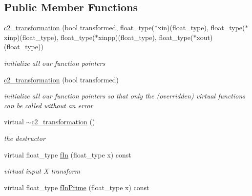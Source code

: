 \subsection*{Public Member Functions}
\begin{DoxyCompactItemize}
\item 
\hyperlink{classc2__transformation_a2b8606275a019b3a64612ecb28272999}{c2\-\_\-transformation} (bool transformed, float\-\_\-type($\ast$xin)(float\-\_\-type), float\-\_\-type($\ast$xinp)(float\-\_\-type), float\-\_\-type($\ast$xinpp)(float\-\_\-type), float\-\_\-type($\ast$xout)(float\-\_\-type))
\begin{DoxyCompactList}\small\item\em initialize all our function pointers \end{DoxyCompactList}\item 
\hyperlink{classc2__transformation_a1cba0d84b0c713e189eb6cf2c08ef1d2}{c2\-\_\-transformation} (bool transformed)
\begin{DoxyCompactList}\small\item\em initialize all our function pointers so that only the (overridden) virtual functions can be called without an error \end{DoxyCompactList}\item 
\hypertarget{classc2__transformation_ad0f684d47ebb7fdc089b7d298cf60120}{virtual \hyperlink{classc2__transformation_ad0f684d47ebb7fdc089b7d298cf60120}{$\sim$c2\-\_\-transformation} ()}\label{classc2__transformation_ad0f684d47ebb7fdc089b7d298cf60120}

\begin{DoxyCompactList}\small\item\em the destructor \end{DoxyCompactList}\item 
\hypertarget{classc2__transformation_a30b16abc3cdbcde5a0dacac94794d34f}{virtual float\-\_\-type \hyperlink{classc2__transformation_a30b16abc3cdbcde5a0dacac94794d34f}{f\-In} (float\-\_\-type x) const }\label{classc2__transformation_a30b16abc3cdbcde5a0dacac94794d34f}

\begin{DoxyCompactList}\small\item\em virtual input X transform \end{DoxyCompactList}\item 
\hypertarget{classc2__transformation_a6b3b1aa9a73981b93b9fd9dbabe2fcb1}{virtual float\-\_\-type \hyperlink{classc2__transformation_a6b3b1aa9a73981b93b9fd9dbabe2fcb1}{f\-In\-Prime} (float\-\_\-type x) const }\label{classc2__transformation_a6b3b1aa9a73981b93b9fd9dbabe2fcb1}


\end{DoxyCompactItemize}
